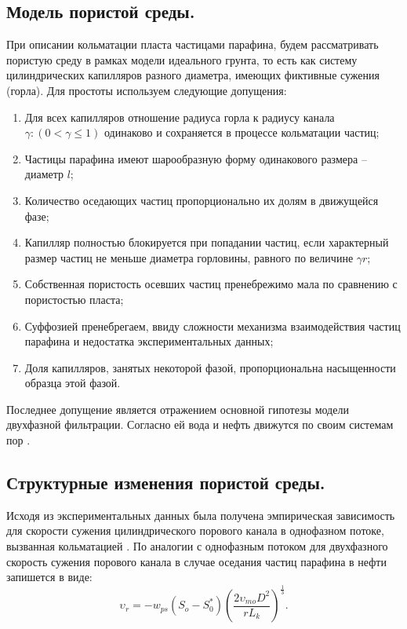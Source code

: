 \documentclass[12pt,twoside,a4paper]{uz_ku}
\begin{document}
\subsection{Модель пористой среды. }
	 При описании кольматации пласта частицами парафина, будем рассматривать пористую среду в рамках модели идеального грунта, то есть как систему цилиндрических капилляров разного диаметра, имеющих фиктивные сужения (горла). Для простоты используем следующие допущения:
\begin{enumerate} 
	\item Для всех капилляров отношение радиуса горла к радиусу канала $\gamma :(0< \gamma \leq 1)$ одинаково и сохраняется в процессе кольматации частиц;
	\item Частицы парафина имеют шарообразную форму одинакового размера – диаметр $l$;
	\item Количество оседающих частиц пропорционально их долям в движущейся фазе;
	\item Капилляр полностью блокируется при попадании частиц, если характерный размер частиц не меньше диаметра горловины, равного по величине $\gamma r$;
	\item Собственная пористость осевших частиц пренебрежимо мала по сравнению с пористостью пласта;
	\item Суффозией пренебрегаем, ввиду сложности механизма взаимодействия частиц парафина и недостатка экспериментальных данных;
	\item Доля капилляров, занятых некоторой фазой, пропорциональна насыщенности образца этой фазой.
\end{enumerate}
Последнее допущение является отражением основной гипотезы модели двухфазной фильтрации. Согласно ей вода и нефть движутся по своим системам пор \cite{13}.

\subsection{Структурные изменения пористой среды. }
	Исходя из экспериментальных данных была получена эмпирическая зависимость для скорости сужения цилиндрического порового канала в однофазном потоке, вызванная кольматацией \cite{8}. По аналогии с однофазным потоком для двухфазного скорость сужения порового канала в случае оседания частиц парафина в нефти запишется в виде:
\begin{equation}\label{eq7}
\upsilon_r = -w_{ps} (S_o-S_{0}^{*}) \left ( \frac{2 \upsilon_{mo} D^2}{r L_k} \right )^{\frac{1}{3}}.
\end{equation}
\end{document}
